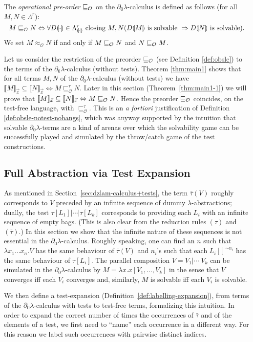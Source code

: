 \documentclass{LMCS}
\newcommand{\dzlam}{\ensuremath{\partial_0\lambda}}
\newcommand{\lam}{\ensuremath{\lambda}}
\renewcommand{\hole}[1]{\llparenthesis #1\rrparenthesis}
\newcommand{\paral}{\vert}
\newcommand{\Set}[1]{\Lambda^{#1}}
\newcommand{\obseq}{\approx_{\mathcal{O}}}
\newcommand{\Tobsle}{\sqsubseteq^{\gt}_{\mathcal{O}}}
\newcommand{\Int}[1]{\llbracket #1\rrbracket} \newcommand{\trm}[1]{#1^{\textrm{--}}}
\renewcommand{\iff}{\Leftrightarrow}
\newcommand{\seq}[1]{\vec{#1}}
\newcommand{\imp}{\Rightarrow}
\newcommand{\gt}{\ensuremath{\tau}}
\newcommand{\gto}{\ensuremath{\bar\tau}}
\begin{document}
\begin{defi}\label{def:obsle-notest-nobangs} 
The \emph{operational pre-order} $\sqsubseteq_{\mathcal{O}}$ on the $\dzlam$-calculus is defined as follows (for all $M,N\in\Set{r}$): 
$$
	M \obsle N \iff \forall D\hole{\cdot}\in\Set{r}_{\hole{\cdot}} \textrm{ closing $M,N$} (D\hole{M} \mbox{ is solvable } \imp D\hole{N} \mbox{ is solvable}). 
$$
We set $M \obseq N$ if and only if $M \sqsubseteq_{\mathcal{O}} N$ and $N \sqsubseteq_{\mathcal{O}} M$. 
\end{defi}

Let us consider the restriction of the preorder $\sqsubseteq_{\mathcal{O}}$ (see Definition \ref{def:obsle}) to the terms of the $\dzlam$-calculus (without tests).
 Theorem \ref{thm:main1} shows that for all terms $M,N$ of the $\dzlam$-calculus (without tests) we have
 $\Int{M}_{\seq x}\subseteq \Int{N}_{\seq x} \iff M \Tobsle N$. Later in this section (Theorem~\ref{thm:main1-1}) we will prove that
 $\Int{M}_{\seq x}\subseteq \Int{N}_{\seq x} \iff M\obsle N$. Hence the preorder $\sqsubseteq_{\mathcal{O}}$ coincides, on the test-free language, with $\Tobsle$.
 This is an \emph{a fortiori} justification of Definition \ref{def:obsle-notest-nobangs}, which was anyway supported by the intuition that
 solvable $\dzlam$-terms are a kind of arenas over which the solvability game can be successfully played and simulated by the throw/catch game of the 
 test constructions.

\subsection{Full Abstraction via Test Expansion}
As mentioned in Section~\ref{sec:dzlam-calculus+tests}, the term $\gto(V)$ roughly corresponds to $V$ preceded by an infinite sequence of dummy $\lambda$-abstractions; 
dually, the test $\gt[L_1]\paral\cdots\paral\gt[L_k]$ corresponds to providing each $L_i$ with an infinite sequence of empty bags.
(This is also clear from the reduction rules $(\gt)$ and $(\gto)$.)
In this section we show that the infinite nature of these sequences is not essential in the \dzlam-calculus.
Roughly speaking, one can find an $n$ such that $\lam x_1\dots x_n.V$ has the same behaviour of $\gto(V)$
and $n_i$'s such that each $L_i[]^{\sim n_i}$ has the same behaviour of $\gt[L_i]$.
The parallel composition $V = V_1\paral\cdots\paral V_k$ can be simulated in the $\dzlam$-calculus by $M = \lam x.x[V_1,\dots,V_k]$
in the sense that $V$ converges iff each $V_i$ converges and, similarly, $M$ is solvable iff each $V_i$ is solvable.

We then define a test-expansion (Definition~\ref{def:labelling-expansion}), from terms of the \dzlam-calculus with tests to test-free terms,
formalizing this intuition.
In order to expand the correct number of times the occurrences of $\gto$ and of the elements of a test, we first 
need to ``name'' each occurrence in a different way.
For this reason we label such occurrences with pairwise distinct indices. 
\end{document}
